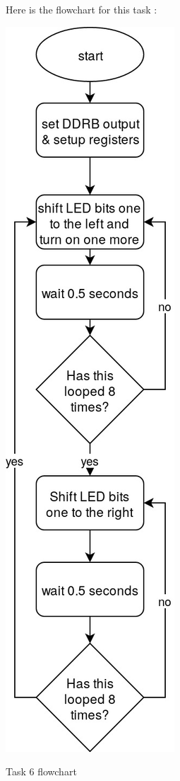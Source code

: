 \documentclass[a4paper,12pt]{article}
\begin{document}
Here is the flowchart for this task : 
\begin{center}
\includegraphics[width=\textwidth/3 ]{flowchart/task6_flowchart.jpg}

Task 6 flowchart
\label{task6}
\end{center}



\end{document}
